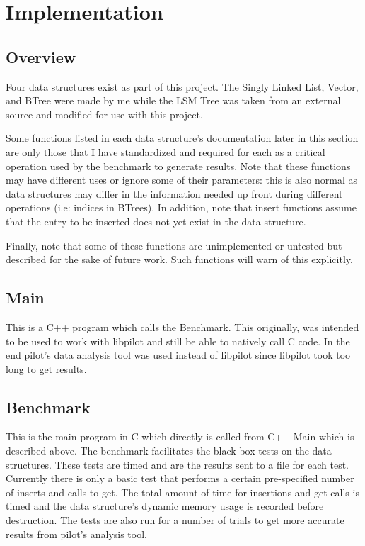 \documentclass[twocolumn]{article}
\begin{document}
\section{Implementation}

\subsection{Overview}

Four data structures exist as part of this project. The Singly Linked List,
Vector, and BTree were made by me while the LSM Tree was taken from an external
source and modified for use with this project.

Some functions listed in each data structure's documentation later in this
section are only those that I have standardized and required for each as a
critical operation used by the benchmark to generate results. Note that these
functions may have different uses or ignore some of their parameters: this is
also normal as data structures may differ in the information needed up front
during different operations (i.e: indices in BTrees). In addition, note that
insert functions assume that the entry to be inserted does not yet exist in the
data structure.

Finally, note that some of these functions are unimplemented or untested but
described for the sake of future work. Such functions will warn of this
explicitly.

\subsection{Main}

This is a C++ program which calls the Benchmark\cite{mixingc/c++}. This
originally, was intended to be used to work with libpilot and still be able to
natively call C code. In the end pilot's data analysis tool was used instead of
libpilot since libpilot took too long to get results.

\subsection{Benchmark}

This is the main program in C which directly is called from C++ Main which is
described above. The benchmark facilitates the black box tests on the data
structures. These tests are timed and are the results sent to a file for each
test. Currently there is only a basic test that performs a certain pre-specified
number of inserts and calls to get. The total amount of time for insertions and
get calls is timed and the data structure's dynamic memory usage is recorded
before destruction. The tests are also run for a number of trials to get
more accurate results from pilot's analysis tool.
\end{document}
